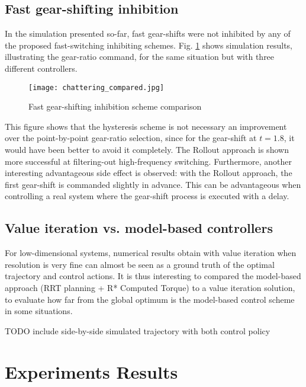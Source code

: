 \subsection{Fast gear-shifting inhibition}

In the simulation presented so-far, fast gear-shifts were not inhibited by any of the proposed fast-switching inhibiting schemes. Fig. \ref{fig:ChatteringComparaison} shows simulation results, illustrating the gear-ratio command, for the same situation but with three different controllers. 
%
\begin{figure}[htp]
	\centering
		\texttt{[image: chattering\_compared.jpg]}
	\caption{Fast gear-shifting inhibition scheme comparison}
	\label{fig:ChatteringComparaison}
\end{figure}

This figure shows that the hysteresis scheme is not necessary an improvement over the point-by-point gear-ratio selection, since for the gear-shift at $t=1.8$, it would have been better to avoid it completely. The Rollout approach is shown more successful at filtering-out high-frequency switching. Furthermore, another interesting advantageous side effect is observed: with the Rollout approach, the first gear-shift is commanded slightly in advance. This can be advantageous when controlling a real system where the gear-shift process is executed with a delay. 

\subsection{Value iteration vs. model-based controllers}

For low-dimensional systems, numerical results obtain with value iteration when resolution is very fine can almost be seen as a ground truth of the optimal trajectory and control actions. It is thus interesting to compared the model-based approach (RRT planning + R* Computed Torque) to a value iteration solution, to evaluate how far from the global optimum is the model-based control scheme in some situations.

TODO include side-by-side simulated trajectory with both control policy



\newpage
\section{Experiments Results}
\label{sec:shift_exp}

